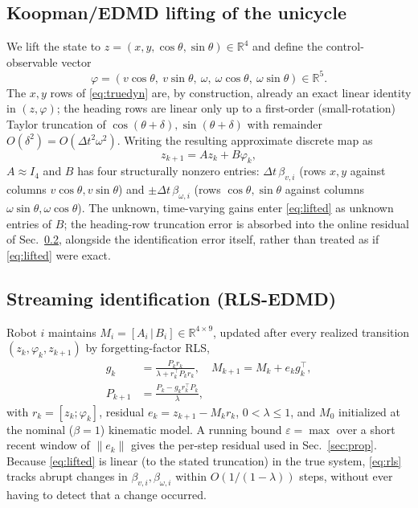 \documentclass[10pt,conference]{IEEEtran}
\begin{document}
\subsection{Koopman/EDMD lifting of the unicycle}
We lift the state to $z=(x,y,\cos\theta,\sin\theta)\in\mathbb{R}^4$ and define the control-observable vector
\begin{equation}
\varphi = (v\cos\theta,\ v\sin\theta,\ \omega,\ \omega\cos\theta,\ \omega\sin\theta)\in\mathbb{R}^5. \label{eq:phi}
\end{equation}
The $x,y$ rows of \eqref{eq:truedyn} are, by construction, already an exact linear identity in $(z,\varphi)$; the heading rows are linear only up to a first-order (small-rotation) Taylor truncation of $\cos(\theta+\delta),\sin(\theta+\delta)$ with remainder $O(\delta^2)=O(\Delta t^2\omega^2)$. Writing the resulting approximate discrete map as
\begin{equation}
z_{k+1} = A z_k + B \varphi_k, \label{eq:lifted}
\end{equation}
$A\approx I_4$ and $B$ has four structurally nonzero entries: $\Delta t\,\beta_{v,i}$ (rows $x,y$ against columns $v\cos\theta,v\sin\theta$) and $\pm\Delta t\,\beta_{\omega,i}$ (rows $\cos\theta,\sin\theta$ against columns $\omega\sin\theta,\omega\cos\theta$). The unknown, time-varying gains enter \eqref{eq:lifted} as unknown entries of $B$; the heading-row truncation error is absorbed into the online residual of Sec.~\ref{sec:rls}, alongside the identification error itself, rather than treated as if \eqref{eq:lifted} were exact.

\subsection{Streaming identification (RLS-EDMD)}
\label{sec:rls}
Robot $i$ maintains $M_i=[A_i\,|\,B_i]\in\mathbb{R}^{4\times9}$, updated after every realized transition $(z_k,\varphi_k,z_{k+1})$ by forgetting-factor RLS,
\begin{equation}
\begin{aligned}
g_k &= \frac{P_k r_k}{\lambda+r_k^\top P_k r_k}, \quad M_{k+1}=M_k+e_k g_k^\top,\\
P_{k+1} &= \frac{P_k-g_k r_k^\top P_k}{\lambda},
\end{aligned}
\label{eq:rls}
\end{equation}
with $r_k=[z_k;\varphi_k]$, residual $e_k=z_{k+1}-M_k r_k$, $0<\lambda\le1$, and $M_0$ initialized at the nominal ($\beta=1$) kinematic model. A running bound $\varepsilon=\max$ over a short recent window of $\|e_k\|$ gives the per-step residual used in Sec.~\ref{sec:prop}. Because \eqref{eq:lifted} is linear (to the stated truncation) in the true system, \eqref{eq:rls} tracks abrupt changes in $\beta_{v,i},\beta_{\omega,i}$ within $O(1/(1-\lambda))$ steps, without ever having to detect that a change occurred.
\end{document}
